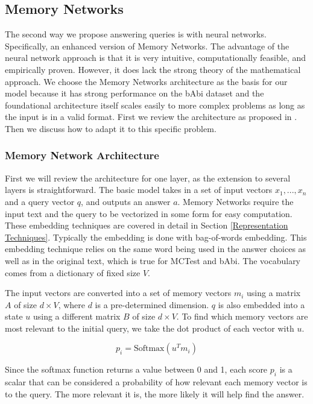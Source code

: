 \documentclass[pageno]{final_paper}
\begin{document}
\subsection{Memory Networks}
\label{Memory Networks}

The second way we propose answering queries is with neural networks.
Specifically, an enhanced version of Memory Networks. The advantage of the
neural network approach is that it is very intuitive, computationally feasible,
and empirically proven. However, it does lack the strong theory of the
mathematical approach. We choose the Memory Networks architecture as the basis
for our model because it has strong performance on the bAbi dataset and the
foundational architecture itself scales easily to more complex problems as long
as the input is in a valid format. First we review the architecture as proposed
in \cite{Sukhbaatar2015}. Then we discuss how to adapt it to this specific
problem. \\

\subsubsection{Memory Network Architecture}
\label{Memory Network Architecture}

First we will review the architecture for one layer, as the extension to several
layers is straightforward. The basic model takes in a set of input vectors $x_1, ...,
x_n$ and a query vector $q$, and outputs an answer $a$. Memory Networks require
the input text and the query to be vectorized in some form for easy computation.
These embedding techniques are covered in detail in Section \ref{Representation
Techniques}. Typically the embedding is done with bag-of-words embedding. This
embedding technique relies on the same word being used in the answer choices as
well as in the original text, which is true for MCTest and bAbi. The vocabulary
comes from a dictionary of fixed size $V$.

The input vectors are converted into a set of memory vectors ${m_i}$ using a
matrix $A$ of size $d\times V$, where $d$ is a pre-determined dimension. $q$ is
also embedded into a state $u$ using a different matrix $B$ of size $d\times V$.
To find which memory vectors are most relevant to the initial query, we take the
dot product of each vector with $u$.

$$p_i = \text{Softmax}(u^Tm_i)$$

Since the softmax function returns a value between 0 and 1, each score $p_i$ is
a scalar that can be considered a probability of how relevant each memory vector
is to the query. The more relevant it is, the more likely it will help find the
answer.
\end{document}
